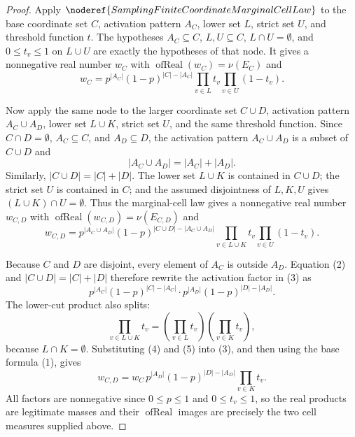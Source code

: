 \begin{proof}
Apply \(\noderef{SamplingFiniteCoordinateMarginalCellLaw}\) to the base
coordinate set \(C\), activation pattern \(A_C\), lower set \(L\), strict set
\(U\), and threshold function \(t\).  The hypotheses \(A_C\subseteq C\),
\(L,U\subseteq C\), \(L\cap U=\emptyset\), and \(0\le t_v\le1\) on
\(L\cup U\) are exactly the hypotheses of that node.  It gives a nonnegative
real number \(w_C\) with \(\operatorname{ofReal}(w_C)=\nu(E_C)\) and
\[
w_C
=p^{|A_C|}(1-p)^{|C|-|A_C|}
  \prod_{v\in L}t_v
  \prod_{v\in U}(1-t_v).
\tag{1}
\]

Now apply the same node to the larger coordinate set \(C\cup D\), activation
pattern \(A_C\cup A_D\), lower set \(L\cup K\), strict set \(U\), and the
same threshold function.  Since \(C\cap D=\emptyset\),
\(A_C\subseteq C\), and \(A_D\subseteq D\), the activation pattern
\(A_C\cup A_D\) is a subset of \(C\cup D\) and
\[
|A_C\cup A_D|=|A_C|+|A_D|.
\tag{2}
\]
Similarly, \(|C\cup D|=|C|+|D|\).  The lower set \(L\cup K\) is contained in
\(C\cup D\); the strict set \(U\) is contained in \(C\); and the assumed
disjointness of \(L,K,U\) gives \((L\cup K)\cap U=\emptyset\).  Thus the
marginal-cell law gives a nonnegative real number \(w_{C,D}\) with
\(\operatorname{ofReal}(w_{C,D})=\nu(E_{C,D})\) and
\[
w_{C,D}
=p^{|A_C\cup A_D|}(1-p)^{|C\cup D|-|A_C\cup A_D|}
  \prod_{v\in L\cup K}t_v
  \prod_{v\in U}(1-t_v).
\tag{3}
\]

Because \(C\) and \(D\) are disjoint, every element of \(A_C\) is outside
\(A_D\).  Equation (2) and \(|C\cup D|=|C|+|D|\) therefore rewrite the
activation factor in (3) as
\[
p^{|A_C|}(1-p)^{|C|-|A_C|}
\cdot
p^{|A_D|}(1-p)^{|D|-|A_D|}.
\tag{4}
\]
The lower-cut product also splits:
\[
\prod_{v\in L\cup K}t_v
=\left(\prod_{v\in L}t_v\right)\left(\prod_{v\in K}t_v\right),
\tag{5}
\]
because \(L\cap K=\emptyset\).  Substituting (4) and (5) into (3), and then
using the base formula (1), gives
\[
w_{C,D}
=w_C\,
  p^{|A_D|}(1-p)^{|D|-|A_D|}
  \prod_{v\in K}t_v .
\]
All factors are nonnegative since \(0\le p\le1\) and \(0\le t_v\le1\), so the
real products are legitimate masses and their \(\operatorname{ofReal}\)
images are precisely the two cell measures supplied above.
\end{proof}
